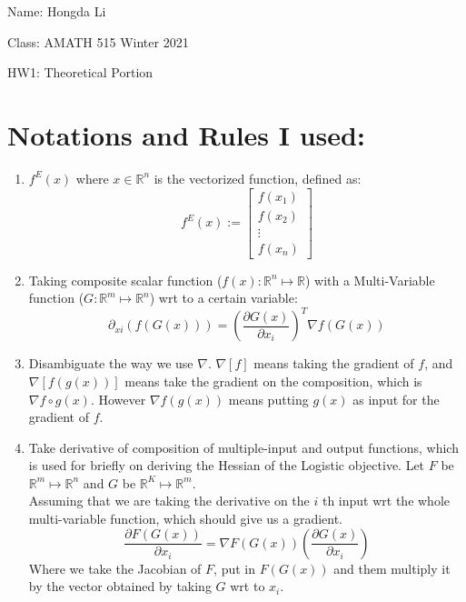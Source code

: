 \documentclass[]{article}
\begin{document}
    \vspace{0.3em} Name: Hongda Li
    \par Class: AMATH 515 Winter 2021
    \par HW1: Theoretical Portion

\section*{Notations and Rules I used: }
\begin{enumerate}
    \item\label{itm:rule1} $f^E(x)$ where $x\in \mathbb{R}^n$ is the vectorized function, defined as:
        $$
        f^E(x) :=
        \begin{bmatrix}
        f(x_1) \\ f(x_2) \\ \vdots \\f(x_n)
        \end{bmatrix}
        $$
    
    \item\label{itm:rule2} Taking composite scalar function ($f(x): \mathbb{R}^n \mapsto \mathbb{R}$) with a Multi-Variable function ($G: \mathbb{R}^m\mapsto \mathbb{R}^n$) wrt to a certain variable:
        $$
        \partial_{xi} (f(G(x))) = \left(
            \frac{\partial G(x)}{\partial{x_i}}
        \right)^T\nabla f(G(x))
        $$
    
    \item Disambiguate the way we use $\nabla$.  $\nabla[f]$ means taking the gradient of $f$, and $\nabla[f(g(x))]$ means take the gradient on the composition, which is $\nabla f\circ g(x) $. However $\nabla f(g(x))$ means putting $g(x)$ as input for the gradient of $f$. 
    
    \item\label{itm:rule4} Take derivative of composition of multiple-input and output functions, which is used for briefly on deriving the Hessian of the Logistic objective. Let $F$ be $\mathbb{R}^m \mapsto \mathbb{R}^n$ and $G$ be $\mathbb{R}^K \mapsto \mathbb{R}^m$. 
    \\
    Assuming that we are taking the derivative on the $i$ th input wrt the whole multi-variable function, which should give us a gradient. 
        $$
            \frac{\partial F(G(x))}{\partial x_i} = \nabla F(G(x)) \left(
                \frac{\partial G(x)}{\partial x_i}
            \right)
        $$
    Where we take the Jacobian of $F$, put in $F(G(x))$ and them multiply it by the vector obtained by taking $G$ wrt to $x_i$.

\end{enumerate}
\end{document}
